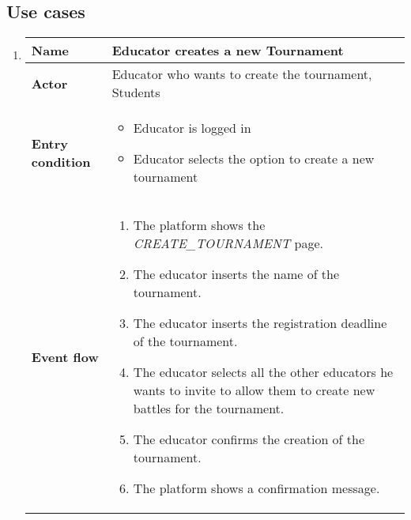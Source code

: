 \subsection{Use cases}
\begin{enumerate}[label=\textbf{UC\arabic*}:,leftmargin=1.3cm]
      \item \textbf{}
            \begin{table}[H]
                  \centering
                  \begin{tabular}{|l|p{11.9cm}|}
                        \hline
                        \textbf{Name}            & Educator creates a new Tournament                                                                 \\\hline
                        \textbf{Actor}           & Educator who wants to create the tournament, Students                                             \\\hline
                        \textbf{Entry condition} &
                        \begin{itemize}
                              \item Educator is logged in
                              \item Educator selects the option to create a new tournament
                        \end{itemize}                                                                  \\\hline
                        \textbf{Event flow}      &
                        \begin{enumerate}[label=\arabic*.]
                              \item The platform shows the \emph{CREATE_TOURNAMENT} page.
                              \item The educator inserts the name of the tournament.
                              \item The educator inserts the registration deadline of the tournament.
                              \item The educator selects all the other educators he wants to invite to allow them to create new battles for the tournament.
                              \item The educator confirms the creation of the tournament.
                              \item The platform shows a confirmation message.

\end{enumerate}
\end{tabular}
\end{table}
\end{enumerate}
